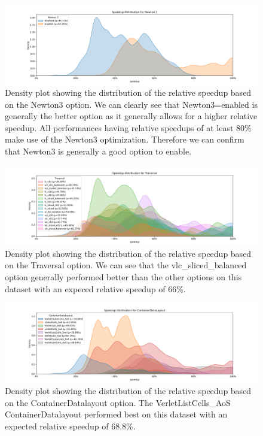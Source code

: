 \begin{figure}[H]
  \centering
  \includegraphics[width=\columnwidth,trim={1cm 0 2cm 1.5cm},clip]{figures/DataAnalytics/speedup_Newton 3.png}
  \caption[Speedup density plot based on the Newton 3 option]{Density plot showing the distribution of the relative speedup based on the Newton3 option. We can clearly see that Newton3=enabled is generally the better option as it generally allows for a higher relative speedup. All performances having relative speedups of at least 80\% make use of the Newton3 optimization. Therefore we can confirm that Newton3 is generally a good option to enable.}
  \label{fig:inputAnalysisDensityNewton3}
\end{figure}

\begin{figure}[H]
  \centering
  \includegraphics[width=\columnwidth,trim={1cm 0 2cm 1.5cm},clip]{figures/DataAnalytics/speedup_Traversal.png}
  \caption[Speedup density plot based on the Traversal option]{Density plot showing the distribution of the relative speedup based on the Traversal option. We can see that the vlc\_sliced\_balanced option generally performed better than the other options on this dataset with an expeced relative speedup of 66\%.}
  \label{fig:inputAnalysisDensityTraversal}
\end{figure}

\begin{figure}[H]
  \centering
  \includegraphics[width=\columnwidth,trim={1cm 0 2cm 1.5cm},clip]{figures/DataAnalytics/speedup_ContainerDataLayout.png}
  \caption[Speedup density plot of Configuration-Datalayout option]{Density plot showing the distribution of the relative speedup based on the ContainerDatalayout option. The VerletListCells\_AoS ContainerDatalayout performed best on this dataset with an expected relative speedup of 68.8\%.}
  \label{fig:inputAnalysisDensityDatalayout}
\end{figure}